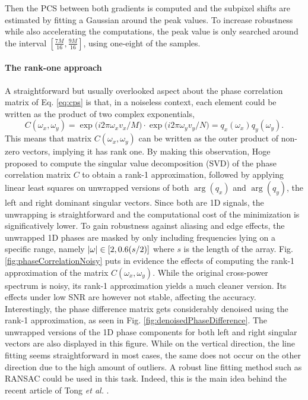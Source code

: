 Then the PCS between both gradients is computed and the subpixel shifts are estimated by fitting a Gaussian around the peak values. To increase robustness while also accelerating the computations, the peak value is only searched around the interval $\left[\frac{7M}{16},\frac{9M}{16}\right]$, using one-eight of the samples. 


\paragraph{The rank-one approach}
A straightforward but usually overlooked aspect about the phase correlation matrix of Eq. \eqref{eq:cps} is that, in a noiseless context, each element could be written as the product of two complex exponentials,
\begin{equation}
	C(\omega_x, \omega_y) = \exp\bigg(i2\pi \omega_x v_x / M\bigg) \cdot \exp \bigg(i 2\pi \omega_y v_y/N\bigg) = q_x(\omega_x) q_y(\omega_y).
\end{equation}
This means that matrix $C(\omega_x,\omega_y)$ can be written as the outer product of non-zero vectors, implying it has rank one. By making this observation, Hoge \cite{Hoge_2003} proposed to compute the singular value decomposition (SVD) of the phase correlation matrix $C$ to obtain a rank-1 approximation, followed by applying linear least squares on unwrapped versions of both $\arg(q_x)$ and $\arg(q_y)$, the left and right dominant singular vectors. Since both are 1D signals, the unwrapping is straightforward and the computational cost of the minimization is significatively lower. To gain robustness against aliasing and edge effects, the unwrapped 1D phases are masked by only including frequencies lying on a specific range, namely $\left\lvert\omega\right\rvert \in [2, 0.6(s/2)]$ where $s$ is the length of the array. Fig. \ref{fig:phaseCorrelationNoisy} puts in evidence the effects of computing the rank-1 approximation of the matrix $C(\omega_x, \omega_y)$. While the original cross-power spectrum is noisy, its rank-1 approximation yields a much cleaner version. Its effects under low SNR are however not stable, affecting the accuracy. Interestingly, the phase difference matrix gets considerably denoised using the rank-1 approximation, as seen in Fig. \ref{fig:denoisedPhaseDifference}. The unwrapped versions of the 1D phase components for both left and right singular vectors are also displayed in this figure. While on the vertical direction, the line fitting seems straightforward in most cases, the same does not occur on the other direction due to the high amount of outliers. A robust line fitting method such as RANSAC could be used in this task. Indeed, this is the main idea behind the recent article of Tong \emph{et al.} \cite{tong2015novel}.

